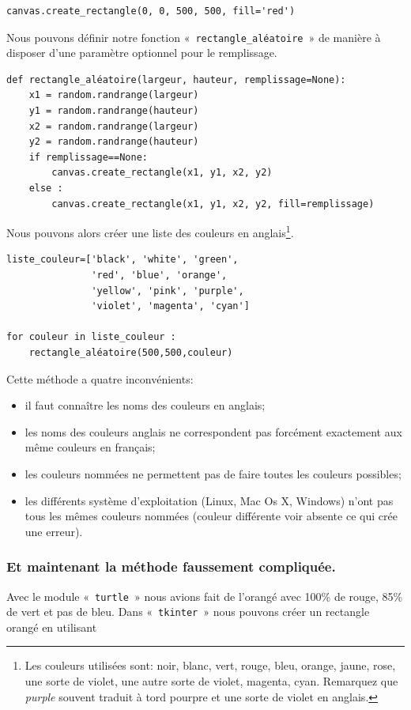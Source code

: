 \begin{Verbatim}[frame=single,rulecolor=\color{gray}, label=exemple]
canvas.create_rectangle(0, 0, 500, 500, fill='red')
\end{Verbatim}

Nous pouvons définir notre fonction «~\texttt{rectangle\_aléatoire}~»  de manière à disposer d'une paramètre optionnel pour le remplissage.

\begin{Verbatim}[frame=single,rulecolor=\color{mbleu}, label=à taper]
def rectangle_aléatoire(largeur, hauteur, remplissage=None):
    x1 = random.randrange(largeur)
    y1 = random.randrange(hauteur)
    x2 = random.randrange(largeur)
    y2 = random.randrange(hauteur)
    if remplissage==None:
        canvas.create_rectangle(x1, y1, x2, y2)
    else :	
        canvas.create_rectangle(x1, y1, x2, y2, fill=remplissage)
\end{Verbatim}

Nous pouvons alors créer une liste des couleurs en anglais\footnote{Les couleurs utilisées sont: noir, blanc, vert, rouge, bleu, orange, jaune, rose, une sorte de violet, une autre sorte de violet, magenta, cyan. Remarquez que \emph{purple} souvent traduit à tord pourpre et une sorte de violet en anglais.}. 

\begin{Verbatim}[frame=single,rulecolor=\color{mbleu}, label=à taper]
liste_couleur=['black', 'white', 'green',
               'red', 'blue', 'orange',
               'yellow', 'pink', 'purple',
               'violet', 'magenta', 'cyan']

for couleur in liste_couleur :
	rectangle_aléatoire(500,500,couleur)
\end{Verbatim}

Cette méthode a quatre inconvénients: 
\begin{itemize}
\item il faut connaître les noms des couleurs en anglais;
\item les noms des couleurs anglais ne correspondent pas forcément exactement aux même couleurs en français;
\item les couleurs nommées ne permettent pas de faire toutes les couleurs possibles;
\item les différents système d'exploitation (Linux, Mac Os X, Windows) n'ont pas tous les mêmes couleurs nommées (couleur différente voir absente ce qui crée une erreur).
\end{itemize}
\subsubsection*{Et maintenant la méthode faussement compliquée.}
Avec le module «~\texttt{turtle}~» nous avions fait de l'orangé avec 100\% de rouge, 85\% de vert et pas de bleu. Dans «~\texttt{tkinter}~» nous pouvons créer un rectangle orangé en utilisant

